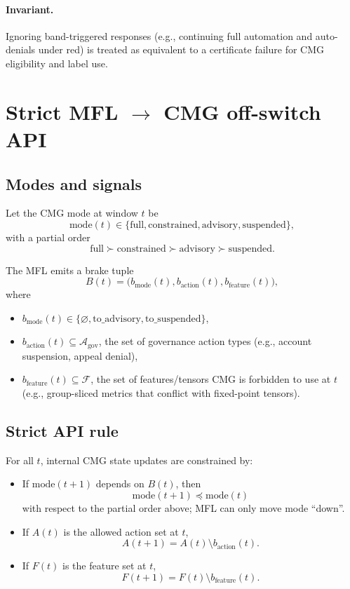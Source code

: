 \documentclass[11pt]{article}
\begin{document}
\paragraph{Invariant.}
Ignoring band-triggered responses (e.g., continuing full automation and auto-denials under red) is treated as equivalent to a certificate failure for CMG eligibility and label use.

\section{Strict MFL \texorpdfstring{\(\rightarrow\)}{->} CMG off-switch API}

\subsection{Modes and signals}

Let the CMG mode at window \(t\) be
\[
\text{mode}(t) \in \{\text{full}, \text{constrained}, \text{advisory}, \text{suspended}\},
\]
with a partial order
\[
\text{full} \succ \text{constrained} \succ \text{advisory} \succ \text{suspended}.
\]

The MFL emits a brake tuple
\[
B(t) = \big(b_{\text{mode}}(t), b_{\text{action}}(t), b_{\text{feature}}(t)\big),
\]
where
\begin{itemize}[leftmargin=*]
  \item \(b_{\text{mode}}(t) \in \{\varnothing, \text{to\_advisory}, \text{to\_suspended}\}\),
  \item \(b_{\text{action}}(t) \subseteq \mathcal{A}_{\text{gov}}\), the set of governance action types (e.g., account suspension, appeal denial),
  \item \(b_{\text{feature}}(t) \subseteq \mathcal{F}\), the set of features/tensors CMG is forbidden to use at \(t\) (e.g., group-sliced metrics that conflict with fixed-point tensors).
\end{itemize}

\subsection{Strict API rule}

For all \(t\), internal CMG state updates are constrained by:

\begin{itemize}[leftmargin=*]
  \item If \(\text{mode}(t+1)\) depends on \(B(t)\), then
  \[
  \text{mode}(t+1) \preceq \text{mode}(t)
  \]
  with respect to the partial order above; MFL can only move mode ``down''.

  \item If \(A(t)\) is the allowed action set at \(t\),
  \[
  A(t+1) = A(t) \setminus b_{\text{action}}(t).
  \]

  \item If \(F(t)\) is the feature set at \(t\),
  \[
  F(t+1) = F(t) \setminus b_{\text{feature}}(t).
  \]
\end{itemize}
\end{document}
